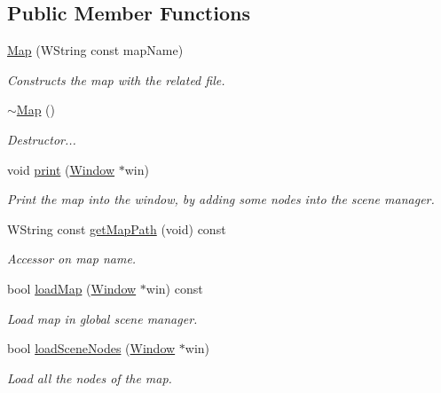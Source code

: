 \subsection*{Public Member Functions}
\begin{DoxyCompactItemize}
\item 
\hyperlink{classMap_a2e6d2bce865999917deae256baaa434d}{Map} (W\+String const map\+Name)
\begin{DoxyCompactList}\small\item\em Constructs the map with the related file. \end{DoxyCompactList}\item 
\mbox{\label{classMap_aa403fbe09394ccf39747588f5168e3b2}} 
\hyperlink{classMap_aa403fbe09394ccf39747588f5168e3b2}{$\sim$\+Map} ()
\begin{DoxyCompactList}\small\item\em Destructor... \end{DoxyCompactList}\item 
\mbox{\label{classMap_a031a9bf528b1d14c60931d37d68bb4e3}} 
void \hyperlink{classMap_a031a9bf528b1d14c60931d37d68bb4e3}{print} (\hyperlink{classWindow}{Window} $\ast$win)
\begin{DoxyCompactList}\small\item\em Print the map into the window, by adding some nodes into the scene manager. \end{DoxyCompactList}\item 
\mbox{\label{classMap_a47f72d481d0ed624dfd03e63ebd281e5}} 
W\+String const \hyperlink{classMap_a47f72d481d0ed624dfd03e63ebd281e5}{get\+Map\+Path} (void) const
\begin{DoxyCompactList}\small\item\em Accessor on map name. \end{DoxyCompactList}\item 
bool \hyperlink{classMap_a37024e6d47ca10cf83a331635fe041b7}{load\+Map} (\hyperlink{classWindow}{Window} $\ast$win) const
\begin{DoxyCompactList}\small\item\em Load map in global scene manager. \end{DoxyCompactList}\item 
bool \hyperlink{classMap_a235c359c04ae1521d53804d029ddce92}{load\+Scene\+Nodes} (\hyperlink{classWindow}{Window} $\ast$win)
\begin{DoxyCompactList}\small\item\em Load all the nodes of the map. \end{DoxyCompactList}\item 

\end{DoxyCompactItemize}
